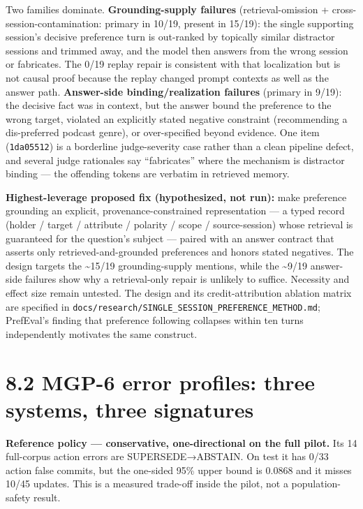 Two families dominate. \textbf{Grounding-supply failures}
(retrieval-omission + cross-session-contamination: primary in 10/19,
present in 15/19): the single supporting session's decisive preference
turn is out-ranked by topically similar distractor sessions and trimmed
away, and the model then answers from the wrong session or fabricates.
The 0/19 replay repair is consistent with that localization but is not
causal proof because the replay changed prompt contexts as well as the
answer path. \textbf{Answer-side binding/realization failures} (primary
in 9/19): the decisive fact was in context, but the answer bound the
preference to the wrong target, violated an explicitly stated negative
constraint (recommending a dis-preferred podcast genre), or
over-specified beyond evidence. One item (\texttt{1da05512}) is a
borderline judge-severity case rather than a clean pipeline defect, and
several judge rationales say ``fabricates'' where the mechanism is
distractor binding --- the offending tokens are verbatim in retrieved
memory.

\textbf{Highest-leverage proposed fix (hypothesized, not run):} make
preference grounding an explicit, provenance-constrained representation
--- a typed record (holder / target / attribute / polarity / scope /
source-session) whose retrieval is guaranteed for the question's subject
--- paired with an answer contract that asserts only
retrieved-and-grounded preferences and honors stated negatives. The
design targets the \textasciitilde15/19 grounding-supply mentions, while
the \textasciitilde9/19 answer-side failures show why a retrieval-only
repair is unlikely to suffice. Necessity and effect size remain
untested. The design and its credit-attribution ablation matrix are
specified in
\texttt{docs/research/SINGLE\_SESSION\_PREFERENCE\_METHOD.md};
PrefEval's finding that preference following collapses within ten turns
\citep{zhao2025prefeval} independently motivates the same construct.

\section{8.2 MGP-6 error profiles: three systems, three
signatures}\label{mgp-6-error-profiles-three-systems-three-signatures}

\textbf{Reference policy --- conservative, one-directional on the full
pilot.} Its 14 full-corpus action errors are SUPERSEDE→ABSTAIN. On test
it has 0/33 action false commits, but the one-sided 95\% upper bound is
0.0868 and it misses 10/45 updates. This is a measured trade-off inside
the pilot, not a population-safety result.

